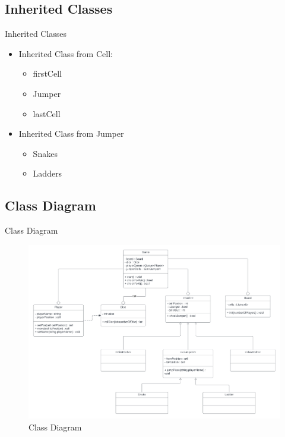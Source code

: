 \documentclass{beamer}
\begin{document}
\subsection{Inherited Classes}
\begin{frame}{Inherited Classes}
    \begin{itemize}
        \item Inherited Class from Cell:
        \begin{itemize}
            \item firstCell
            \item Jumper
            \item lastCell
        \end{itemize}
        \item Inherited Class from Jumper
        \begin{itemize}
            \item Snakes
            \item Ladders
        \end{itemize}
    \end{itemize}
\end{frame}
\subsection{Class Diagram}
\begin{frame}{Class Diagram}
    \begin{figure}
        \centering
        \includegraphics[width = 0.9\linewidth]{images/Class Diagram.png}
        \caption{Class Diagram}
        \label{fig:enter-label}
    \end{figure}
\end{frame}
\end{document}
